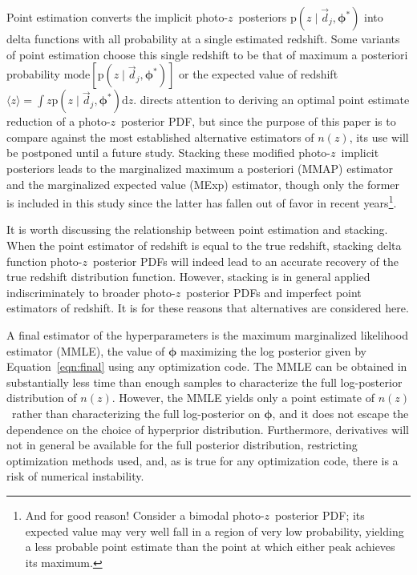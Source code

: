 \documentclass[iop]{emulateapj}
\newcommand{\Eq}[1]{Equation~\ref{#1}}
\newcommand{\data}{\ensuremath{\vec{d}}}%
\newcommand{\pr}[1]{\ensuremath{\mathrm{p}(#1)}}%
\newcommand{\gvn}{\mid}%
\newcommand{\integral}[2]{\ensuremath{\int #1 \mathrm{d} #2}}
\newcommand{\pz}{photo-$z$}
\newcommand{\pzpdf}{\pz\ posterior PDF}%
\newcommand{\pzip}{\pz\ implicit posterior}
\newcommand{\nz}{$n(z)$}
\newcommand{\bvec}[1]{\ensuremath{\boldsymbol{#1}}}%
\newcommand{\ndphi}{\bvec{\phi}}
\begin{document}
Point estimation converts the implicit \pz\ posteriors $\pr{z \gvn \data_{j}, \ndphi^{*}}$ into delta functions with all probability at a single estimated redshift.
Some variants of point estimation choose this single redshift to be that of maximum a posteriori probability $\mathrm{mode}[\pr{z \gvn \data_{j}, \ndphi^{*}}]$ or the expected value of redshift $\langle z \rangle = \integral{z \pr{z \gvn \data_{j}, \ndphi^{*}}}{z}$.
\citet{tanaka_photometric_2018} directs attention to deriving an optimal point estimate reduction of a \pzpdf, but since the purpose of this paper is to compare against the most established alternative estimators of \nz, its use will be postponed until a future study.
Stacking these modified \pzip s leads to the marginalized maximum a posteriori (MMAP) estimator and the marginalized expected value (MExp) estimator, though only the former is included in this study since the latter has fallen out of favor in recent years\footnote{And for good reason!  Consider a bimodal \pzpdf; its expected value may very well fall in a region of very low probability, yielding a less probable point estimate than the point at which either peak achieves its maximum.}.

It is worth discussing the relationship between point estimation and stacking.
When the point estimator of redshift is equal to the true redshift, stacking delta function \pzpdf s will indeed lead to an accurate recovery of the true redshift distribution function.
However, stacking is in general applied indiscriminately to broader \pzpdf s and imperfect point estimators of redshift.
It is for these reasons that alternatives are considered here.

A final estimator of the hyperparameters is the maximum marginalized likelihood estimator (MMLE), the value of $\ndphi$ maximizing the log posterior given by \Eq{eqn:final} using any optimization code.
The MMLE can be obtained in substantially less time than enough samples to characterize the full log-posterior distribution of \nz.
However, the MMLE yields only a point estimate of \nz\ rather than characterizing the full log-posterior on $\ndphi$, and it does not escape the dependence on the choice of hyperprior distribution.
Furthermore, derivatives will not in general be available for the full posterior distribution, restricting optimization methods used, and, as is true for any optimization code, there is a risk of numerical instability.
\end{document}
